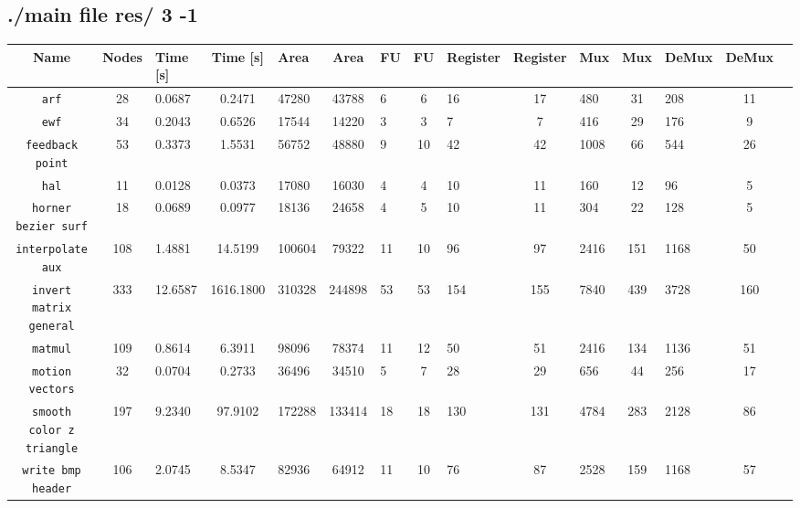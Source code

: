 \documentclass[a4paper, 11pt, oneside]{article}
\begin{document}
\begin{landscape}
\clearpage
\subsection{./main file res/ 3 -1}
\begin{table}[!h]
  \begin{center}
    \begin{tabular}{|c|c V{3} c|g|c|g|c|g|c|g|c|g|c|g|}
    \hline
    \textbf{Name} & \textbf{Nodes} & \textbf{Time [s]} & \textbf{Time [s]} & \textbf{Area} & \textbf{Area} & \textbf{FU} & \textbf{FU} & \textbf{Register} & \textbf{Register} & \textbf{Mux} & \textbf{Mux}
    & \textbf{DeMux} & \textbf{DeMux}\\
    \hline
    \texttt{arf}										  &  28 &  0.0687 &    0.2471 &  47280 &  43788 &  6 &  6 &  16 &  17 &  480 &  31 &  208 &  11 \\ \hline
    \texttt{ewf}										  &  34 &  0.2043 &    0.6526 &  17544 &  14220 &  3 &  3 &   7 &   7 &  416 &  29 &  176 &   9 \\ \hline
    \texttt{feedback point}					  &  53 &  0.3373 &    1.5531 &  56752 &  48880 &  9 & 10 &  42 &  42 & 1008 &  66 &  544 &  26 \\ \hline
    \texttt{hal}										  &  11 &  0.0128 &    0.0373 &  17080 &  16030 &  4 &  4 &  10 &  11 &  160 &  12 &   96 &   5 \\ \hline
    \texttt{horner bezier surf}			  &  18 &  0.0689 &    0.0977 &  18136 &  24658 &  4 &  5 &  10 &  11 &  304 &  22 &  128 &   5 \\ \hline
    \texttt{interpolate aux}				  & 108 &  1.4881 &   14.5199 & 100604 &  79322 & 11 & 10 &  96 &  97 & 2416 & 151 & 1168 &  50 \\ \hline
    \texttt{invert matrix general}	  & 333 & 12.6587 & 1616.1800 & 310328 & 244898 & 53 & 53 & 154 & 155 & 7840 & 439 & 3728 & 160 \\ \hline
    \texttt{matmul}									  & 109 &  0.8614 &    6.3911 &  98096 &  78374 & 11 & 12 &  50 &  51 & 2416 & 134 & 1136 &  51 \\ \hline
    \texttt{motion vectors}					  &  32 &  0.0704 &    0.2733 &  36496 &  34510 &  5 &  7 &  28 &  29 &  656 &  44 &  256 &  17 \\ \hline
    \texttt{smooth color z triangle}	& 197 &  9.2340 &   97.9102 & 172288 & 133414 & 18 & 18 & 130 & 131 & 4784 & 283 & 2128 &  86 \\ \hline
    \texttt{write bmp header}				  & 106 &  2.0745 &    8.5347 &  82936 &  64912 & 11 & 10 &  76 &  87 & 2528 & 159 & 1168 &  57 \\ \hline
  \end{tabular}
  \end{center}
\end{table}
\end{landscape}

\end{document}

